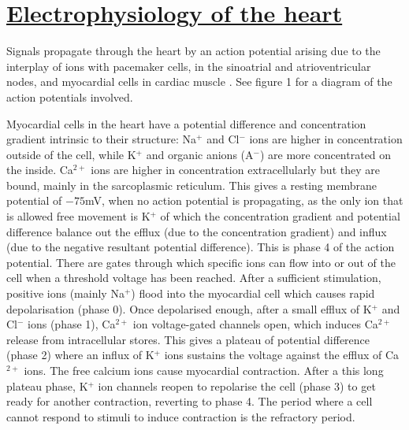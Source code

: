 \documentclass[twocolumn]{article}
\begin{document}
\section{\textbf{\underline{Electrophysiology of the heart}}}

Signals propagate through the heart by an action potential arising due to the interplay of ions with pacemaker cells, in the sinoatrial and atrioventricular nodes, and myocardial cells in cardiac muscle \cite{Augustus}. See figure 1 for a diagram of the action potentials involved.

 Myocardial cells in the heart have a potential difference and concentration gradient intrinsic to their structure: Na$^{+}$ and Cl$^{-}$ ions are higher in concentration outside of the cell, while K$^{+}$ and organic anions (A$^{-}$) are more concentrated on the inside. Ca$^{2+}$  ions are higher in concentration extracellularly but they are bound, mainly in the sarcoplasmic reticulum. 
This gives a resting membrane potential of $-75$mV, when no action potential is propagating, as the only ion that is allowed free movement is K$^{+}$ of which the concentration gradient and potential difference balance out the efflux (due to the concentration gradient) and influx (due to the negative resultant potential difference). This is phase 4 of the action potential. There are gates through which specific ions can flow into or out of the cell when a threshold voltage has been reached. After a sufficient stimulation, positive ions (mainly Na$^{+}$)  flood into the myocardial cell which causes rapid depolarisation (phase 0). Once depolarised enough, after a small efflux of K$^{+}$ and  Cl$^{-}$ ions (phase 1), Ca$^{2+}$ ion voltage-gated channels open, which induces Ca$^{2+}$ release from intracellular stores. This gives a plateau of potential difference (phase 2) where an influx of  K$^{+}$ ions sustains the voltage against the efflux of  Ca$^{2+}$ ions. The free calcium ions cause myocardial contraction. After a this long plateau phase,  K$^{+}$ ion channels reopen to repolarise the cell (phase 3) to get ready for another contraction, reverting to phase 4. The period where a cell cannot respond to stimuli to induce contraction is the refractory period. 



\end{document}
